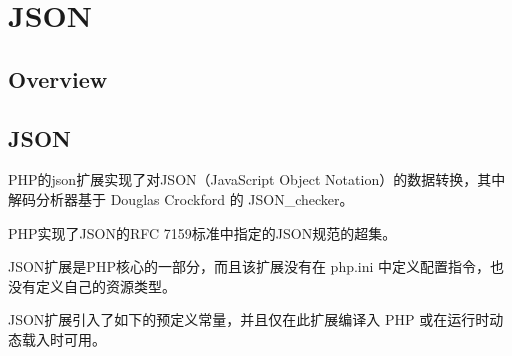 \part{JSON}

\chapter{Overview}




\chapter{JSON}


PHP的json扩展实现了对JSON（JavaScript Object Notation）的数据转换，其中解码分析器基于 Douglas Crockford 的 JSON\_checker。

PHP实现了JSON的RFC 7159标准中指定的JSON规范的超集。


JSON扩展是PHP核心的一部分，而且该扩展没有在 php.ini 中定义配置指令，也没有定义自己的资源类型。

JSON扩展引入了如下的预定义常量，并且仅在此扩展编译入 PHP 或在运行时动态载入时可用。



